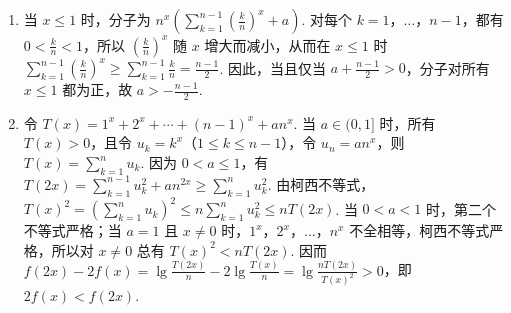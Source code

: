 \begin{solution}
\begin{enumerate}
\item 当 \(x\leqslant1\) 时，分子为 \(n^x\left(\sum_{k=1}^{n-1}\left(\frac{k}{n}\right)^x+a\right)\). 对每个 \(k=1\)，\(\ldots\)，\(n-1\)，都有 \(0<\frac{k}{n}<1\)，所以 \(\left(\frac{k}{n}\right)^x\) 随 \(x\) 增大而减小，从而在 \(x\leqslant1\) 时 \(\sum_{k=1}^{n-1}\left(\frac{k}{n}\right)^x\geqslant\sum_{k=1}^{n-1}\frac{k}{n}=\frac{n-1}{2}\). 因此，当且仅当 \(a+\frac{n-1}{2}>0\)，分子对所有 \(x\leqslant1\) 都为正，故 \(a>-\frac{n-1}{2}\).
\item 令 \(T(x)=1^x+2^x+\cdots+(n-1)^x+an^x\). 当 \(a\in(0,1]\) 时，所有 \(T(x)>0\)，且令 \(u_k=k^x\)（\(1\leqslant k\leqslant n-1\)），令 \(u_n=an^x\)，则 \(T(x)=\sum_{k=1}^{n}u_k\). 因为 \(0<a\leqslant1\)，有 \(T(2x)=\sum_{k=1}^{n-1}u_k^2+an^{2x}\geqslant\sum_{k=1}^{n}u_k^2\). 由柯西不等式，\(T(x)^2=\left(\sum_{k=1}^{n}u_k\right)^2\leqslant n\sum_{k=1}^{n}u_k^2\leqslant nT(2x)\). 当 \(0<a<1\) 时，第二个不等式严格；当 \(a=1\) 且 \(x\neq0\) 时，\(1^x\)，\(2^x\)，\(\ldots\)，\(n^x\) 不全相等，柯西不等式严格，所以对 \(x\neq0\) 总有 \(T(x)^2<nT(2x)\). 因而 \(f(2x)-2f(x)=\lg\frac{T(2x)}{n}-2\lg\frac{T(x)}{n}=\lg\frac{nT(2x)}{T(x)^2}>0\)，即 \(2f(x)<f(2x)\).
\end{enumerate}
\end{solution}
